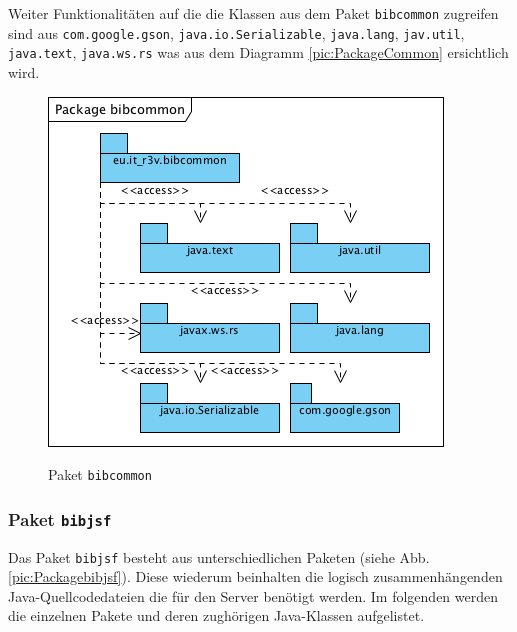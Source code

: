 \documentclass[fontsize=12pt,paper=a4,twoside]{scrartcl}
\begin{document}
Weiter Funktionalitäten auf die die Klassen aus dem Paket \texttt{bibcommon} zugreifen sind aus \texttt{com.google.gson}, \texttt{java.io.Serializable}, \texttt{java.lang}, \texttt{jav.util}, \texttt{java.text}, \texttt{java.ws.rs} was aus dem Diagramm \vref{pic:PackageCommon} ersichtlich wird.

\begin{figure} [H] 
\caption{Paket \texttt{bibcommon}} \centering
	\includegraphics[scale=2]{Diagramme/Packagebibcommon.png} 
	\label{pic:PackageCommon} 
\end{figure}


\newpage
\subsubsection{Paket \texttt{bibjsf}}
\label{sec:bibclient}

Das Paket \texttt{bibjsf} besteht aus unterschiedlichen Paketen (siehe Abb. \vref{pic:Packagebibjsf}). Diese wiederum beinhalten die logisch zusammenhängenden Java-Quellcodedateien die für den Server benötigt werden. Im folgenden werden die einzelnen Pakete und deren zughörigen Java-Klassen aufgelistet. 
\end{document}
